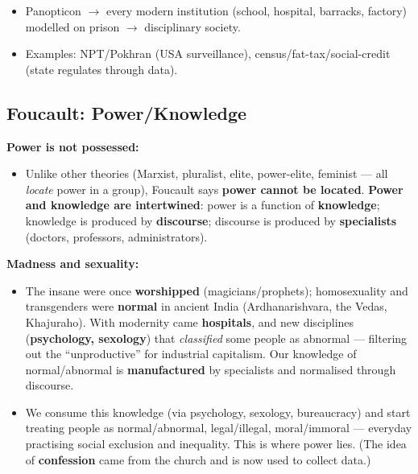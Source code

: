\begin{QuickRevision}
\begin{itemize}
\item Panopticon $\rightarrow$ every modern institution (school, hospital, barracks, factory) modelled on prison $\rightarrow$ disciplinary society.
\item Examples: NPT/Pokhran (USA surveillance), census/fat-tax/social-credit (state regulates through data).
\end{itemize}
\end{QuickRevision}

\sectiondivider

\subsection{Foucault: Power/Knowledge}

\begin{KeyConcept}
\textbf{Power is not possessed:}
\begin{itemize}
\item Unlike other theories (Marxist, pluralist, elite, power-elite, feminist --- all \textit{locate} power in a group), Foucault says \textbf{power cannot be located}. \textbf{Power and knowledge are intertwined}: power is a function of \textbf{knowledge}; knowledge is produced by \textbf{discourse}; discourse is produced by \textbf{specialists} (doctors, professors, administrators).
\end{itemize}
\end{KeyConcept}

\begin{ExampleBox}
\textbf{Madness and sexuality:}
\begin{itemize}
\item The insane were once \textbf{worshipped} (magicians/prophets); homosexuality and transgenders were \textbf{normal} in ancient India (Ardhanarishvara, the Vedas, Khajuraho). With modernity came \textbf{hospitals}, and new disciplines (\textbf{psychology, sexology}) that \textit{classified} some people as abnormal --- filtering out the ``unproductive'' for industrial capitalism. Our knowledge of normal/abnormal is \textbf{manufactured} by specialists and normalised through discourse.
\item We consume this knowledge (via psychology, sexology, bureaucracy) and start treating people as normal/abnormal, legal/illegal, moral/immoral --- everyday practising social exclusion and inequality. This is where power lies. (The idea of \textbf{confession} came from the church and is now used to collect data.)
\end{itemize}
\end{ExampleBox}

